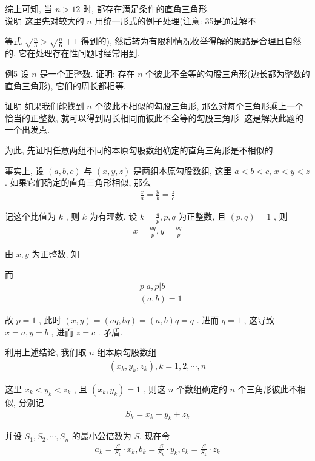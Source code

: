 	综上可知, 当 $n>12$ 时, 都存在满足条件的直角三角形.\\
	说明 这里先对较大的 $n$ 用统一形式的例子处理(注意: 35是通过解不

	等式 $\sqrt{\frac{n}{3}}>\sqrt{\frac{n}{6}}+1$ 得到的), 然后转为有限种情况枚举得解的思路是合理且自然的, 它在处理存在性问题时经常用到.

	例5 设 $n$ 是一个正整数. 证明: 存在 $n$ 个彼此不全等的勾股三角形(边长都为整数的直角三角形), 它们的周长都相等.

	证明 如果我们能找到 $n$ 个彼此不相似的勾股三角形, 那么对每个三角形乘上一个恰当的正整数, 就可以得到周长相同而彼此不全等的勾股三角形. 这是解决此题的一个出发点.

	为此, 先证明任意两组不同的本原勾股数组确定的直角三角形是不相似的.

	事实上, 设 $(a, b, c)$ 与 $(x, y, z)$ 是两组本原勾股数组, 这里 $a<b<c$, $x<y<z$ . 如果它们确定的直角三角形相似, 那么
\begin{align*}
		\frac{x}{a}=\frac{y}{b}=\frac{z}{c}
	\end{align*}

	记这个比值为 $k$ , 则 $k$ 为有理数. 设 $k=\frac{q}{p}, p ,  q$ 为正整数, 且 $(p, q)=1$ , 则
\begin{align*}
		x=\frac{a q}{p}, y=\frac{b q}{p}
	\end{align*}

	由 $x ,  y$ 为正整数, 知

	而\begin{align}
		 & p|a, p| b \\
		 & (a, b)=1
	\end{align}

	故 $p=1$ , 此时 $(x, y)=(a q, b q)=(a, b) q=q$ . 进而 $q=1$ , 这导致 $x=a, y=b$ , 进而 $z=c$ . 矛盾.

	利用上述结论, 我们取 $n$ 组本原勾股数组
\begin{align*}
		\left(x_{k}, y_{k}, z_{k}\right), k=1,2, \cdots, n
	\end{align*}

	这里 $x_{k}<y_{k}<z_{k}$ , 且 $\left(x_{k}, y_{k}\right)=1$ , 则这 $n$ 个数组确定的 $n$ 个三角形彼此不相似, 分别记
\begin{align*}
		S_{k}=x_{k}+y_{k}+z_{k}
	\end{align*}

	并设 $S_{1}, S_{2}, \cdots, S_{n}$ 的最小公倍数为 $S$. 现在令
\begin{align*}
		a_{k}=\frac{S}{S_{k}} \cdot x_{k}, b_{k}=\frac{S}{S_{k}} \cdot y_{k}, c_{k}=\frac{S}{S_{k}} \cdot z_{k}
	\end{align*}

